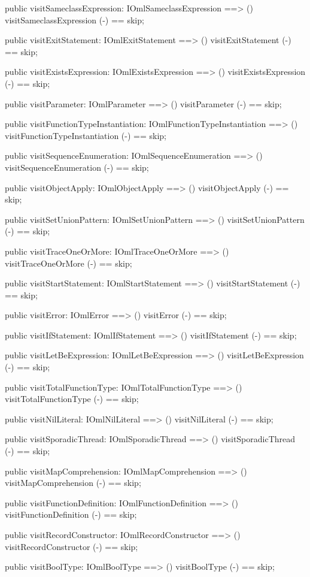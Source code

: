 \begin{vdm_al}
  public visitSameclassExpression: IOmlSameclassExpression ==> ()
  visitSameclassExpression (-) == skip;

  public visitExitStatement: IOmlExitStatement ==> ()
  visitExitStatement (-) == skip;

  public visitExistsExpression: IOmlExistsExpression ==> ()
  visitExistsExpression (-) == skip;

  public visitParameter: IOmlParameter ==> ()
  visitParameter (-) == skip;

  public visitFunctionTypeInstantiation: IOmlFunctionTypeInstantiation ==> ()
  visitFunctionTypeInstantiation (-) == skip;

  public visitSequenceEnumeration: IOmlSequenceEnumeration ==> ()
  visitSequenceEnumeration (-) == skip;

  public visitObjectApply: IOmlObjectApply ==> ()
  visitObjectApply (-) == skip;

  public visitSetUnionPattern: IOmlSetUnionPattern ==> ()
  visitSetUnionPattern (-) == skip;

  public visitTraceOneOrMore: IOmlTraceOneOrMore ==> ()
  visitTraceOneOrMore (-) == skip;

  public visitStartStatement: IOmlStartStatement ==> ()
  visitStartStatement (-) == skip;

  public visitError: IOmlError ==> ()
  visitError (-) == skip;

  public visitIfStatement: IOmlIfStatement ==> ()
  visitIfStatement (-) == skip;

  public visitLetBeExpression: IOmlLetBeExpression ==> ()
  visitLetBeExpression (-) == skip;

  public visitTotalFunctionType: IOmlTotalFunctionType ==> ()
  visitTotalFunctionType (-) == skip;

  public visitNilLiteral: IOmlNilLiteral ==> ()
  visitNilLiteral (-) == skip;

  public visitSporadicThread: IOmlSporadicThread ==> ()
  visitSporadicThread (-) == skip;

  public visitMapComprehension: IOmlMapComprehension ==> ()
  visitMapComprehension (-) == skip;

  public visitFunctionDefinition: IOmlFunctionDefinition ==> ()
  visitFunctionDefinition (-) == skip;

  public visitRecordConstructor: IOmlRecordConstructor ==> ()
  visitRecordConstructor (-) == skip;

  public visitBoolType: IOmlBoolType ==> ()
  visitBoolType (-) == skip;


\end{vdm_al}
